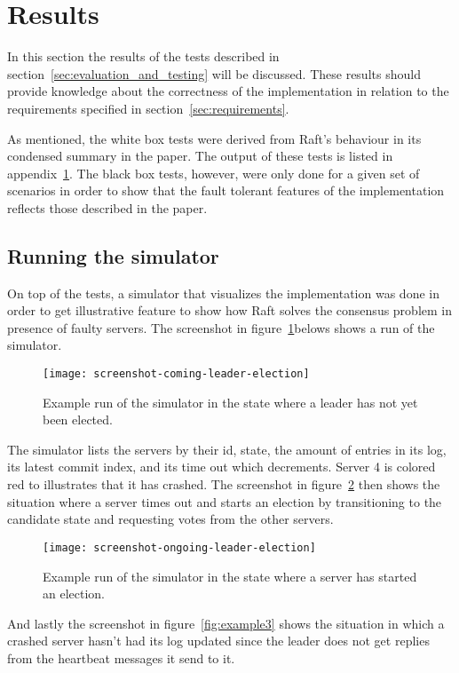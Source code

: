\section{Results}
\label{sec:results}

In this section the results of the tests described in section~\ref{sec:evaluation_and_testing} will be discussed. These results should provide knowledge about the correctness of the implementation in relation to the requirements specified in section~\ref{sec:requirements}.

As mentioned, the white box tests were derived from Raft's behaviour in its condensed summary in the paper. The output of these tests is listed in appendix~\ref{sec:results}.
The black box tests, however, were only done for a given set of scenarios in order to show that the fault tolerant features of the implementation reflects those described in the paper.

\subsection{Running the simulator}
On top of the tests, a simulator that visualizes the implementation was done in order to get illustrative feature to show how Raft solves the consensus problem in presence of faulty servers. The screenshot in figure~\ref{fig:example1}belows shows a run of the simulator.

\begin{figure}[H]
\centering
\texttt{[image: screenshot-coming-leader-election]}
\caption{Example run of the simulator in the state where a leader has not yet been elected.}
\label{fig:example1}
\end{figure}

The simulator lists the servers by their id, state, the amount of entries in its log, its latest commit index, and its time out which decrements. Server 4 is colored red to illustrates that it has crashed.
The screenshot in figure~\ref{fig:example2} then shows the situation where a server times out and starts an election by transitioning to the candidate state and requesting votes from the other servers.

\begin{figure}[H]
\centering
\texttt{[image: screenshot-ongoing-leader-election]}
\caption{Example run of the simulator in the state where a server has started an election.}
\label{fig:example2}
\end{figure}

And lastly the screenshot in figure~\ref{fig:example3} shows the situation in which a crashed server hasn't had its log updated since the leader does not get replies from the heartbeat messages it send to it.

